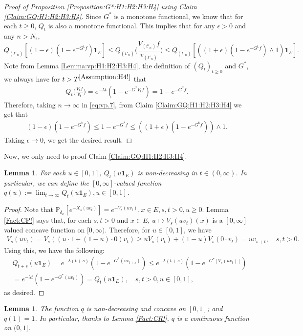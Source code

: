 \documentclass[12pt,a4paper]{amsart}
\numberwithin{equation}{section}
\theoremstyle{plain}
\newtheorem{lem}[thm]{Lemma}
\theoremstyle{definition}
\theoremstyle{remark}
\newcounter{N}
\newcounter{n}[N]
\begin{document}
\begin{proof}[Proof of Proposition \ref{Proposition:G*:H1:H2:H3:H4} using Claim \ref{Claim:GQ:H1:H2:H3:H4}]
Since $G^*$ is a monotone functional, we know that for each $t\geq 0$, $Q_t$ is also a monotone functional.
This implies that  for any $\epsilon>0$ and any $n>N_\epsilon$,
\begin{equation}
\label{eq:vp.7}
 Q_{(t'_n)}[ (1-\epsilon) (1-e^{-G^{\mathbf t}f})\mathbf 1_E ]
   \leq Q_{(t'_n)}\Big( \frac{V_{(t'_n)}f}{v_{(t'_n)}} \Big) 
   \leq Q_{(t'_n)}[ ( (1+\epsilon) (1-e^{-G^{\mathbf t}f}) \wedge 1) \mathbf 1_E ].
 \end{equation}
Note from Lemma \ref{Lemma:vp:H1:H2:H3:H4}, the definition of $(Q_t)_{t\geq 0}$ and $G^*$, we always have for $t>T^{\ref{Assumption:H4!}}$ that
\begin{align}
 Q_t \Big( \frac{V_tf}{v_t}  \Big) 
   = e^{- \lambda t}( 1 - e^{- G^*V_tf}  )
   = 1- e^{- G^* f}.
 \end{align}
Therefore, taking $n \to \infty$ in \eqref{eq:vp.7}, from Claim \ref{Claim:GQ:H1:H2:H3:H4}  we get that
\begin{align}
 (1 - \epsilon) (1 - e^{- G^{\mathbf t}f})
   \leq 1 - e^{- G^* f} 
   \leq ((1 + \epsilon) (1 - e^{- G^{\mathbf t} f}))\wedge 1.
 \end{align}
Taking $\epsilon \to 0$, we get the desired result.
\end{proof}
Now, we only need to proof Claim \ref{Claim:GQ:H1:H2:H3:H4}.

\begin{lem} \label{Lemma:QM!} 
For each $u \in [0,1]$, $Q_t(u\mathbf 1_E)$ is non-decreasing in $t\in (0,\infty)$. 
In particular, we can define the $[0,\infty]$-valued function $q(u):= \lim_{t\to \infty} Q_t(u\mathbf 1_E), u\in [0,1]$.
\end{lem}

\begin{proof}
Note that $\mathbb P_{\delta_x}[e^{- X_s(uv_t)}] = e^{-V_s(uv_t)},x\in E, s,t>0, u \geq 0$.
Lemma \ref{Fact:CP!} says that, for each $s,t > 0$ and $x\in E$, $u\mapsto V_s(uv_t)(x) $ is a $[0,\infty]$-valued concave function on $[0,\infty)$. 
Therefore, for $u\in [0,1]$, we have
\begin{align}
 V_s(uv_t)
   =V_s((u\cdot 1 + (1-u) \cdot 0)v_t) 
   \geq uV_s(v_t) + (1-u) V_s(0\cdot v_t) 
   = uv_{s+t},
   \quad s,t > 0.
 \end{align} 
Using this, we have the following: 
\begin{align}
  & Q_{t+s}(u\mathbf 1_E) 
 = e^{- \lambda (t+s)} ( 1-e^{-G^*(uv_{t+s})} ) 
 \leq e^{- \lambda(t+s)}( 1-e^{-G^*[V_s(uv_t)]} ) \\
 & = e^{-\lambda t}( 1-e^{-G^*(uv_t)} )
     = Q_t(u\mathbf 1_E),
 \quad s,t > 0, u \in [0,1],
 \end{align}
as desired.
\end{proof}
\begin{lem} \label{Lemma:qC!} 
The function $q$ is non-decreasing and concave on $[0,1]$; and $q(1) = 1$.
In particular, thanks to Lemma \ref{Fact:CR!}, $q$ is a continuous function on $(0,1]$.
\end{lem}
\end{document}
